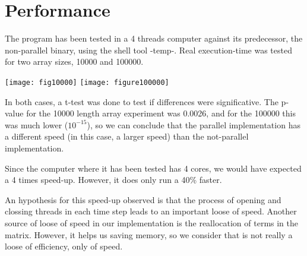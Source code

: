 \documentclass{article}
\begin{document}
\section {Performance}

	The program has been tested in a 4 threads computer against its predecessor,
	the non-parallel binary, using the shell tool -temp-. Real execution-time
	was tested for two array sizes, 10000 and 100000.

	\texttt{[image: fig10000]}
	\texttt{[image: figure100000]}

	In both cases, a t-test was done to test if differences were significative.
	The p-value for the 10000 length array experiment was 0.0026, and for the
	100000 this was much lower ($10^{-15}$), so we can conclude that
	the parallel implementation has a different speed (in this case, a
	larger speed) than the not-parallel implementation.

	Since the computer where it has been tested has 4 cores, we would have
	expected a 4 times speed-up. However, it does only run a 40\% faster.

	An hypothesis for this speed-up observed is that the process of opening and
	clossing threads in each time step leads to an important loose of
	speed. Another source of loose of speed in our implementation is the
	reallocation of terms in the matrix. However, it helps us saving memory,
	so we consider that is not really a loose of efficiency, only of speed.
\end{document}
